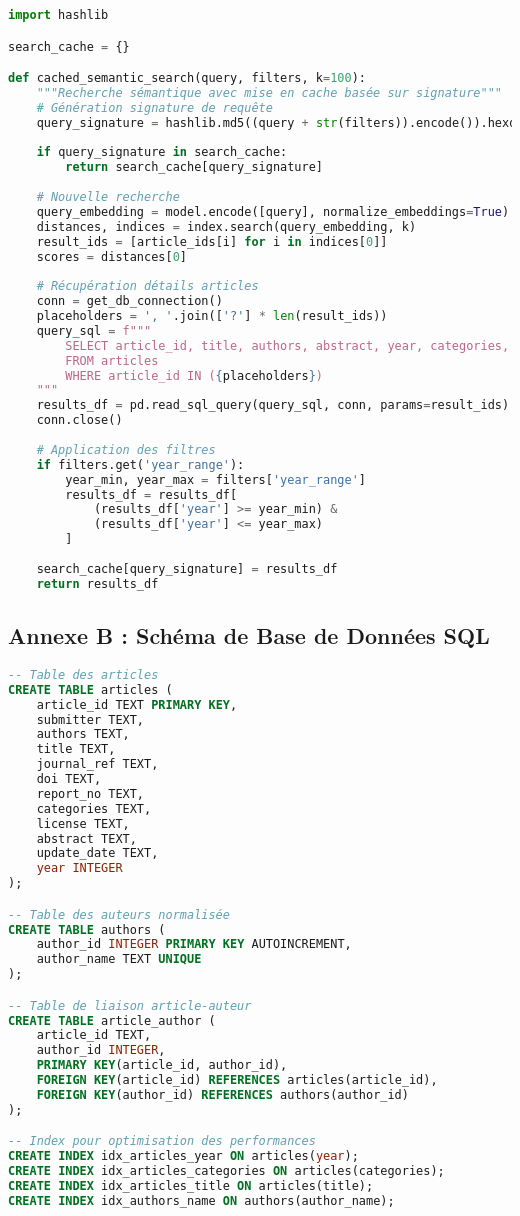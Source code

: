 \documentclass[12pt,a4paper]{article}
\begin{document}
\begin{lstlisting}[language=Python, caption=Implémentation de la recherche sémantique cachée]
import hashlib

search_cache = {}

def cached_semantic_search(query, filters, k=100):
    """Recherche sémantique avec mise en cache basée sur signature"""
    # Génération signature de requête
    query_signature = hashlib.md5((query + str(filters)).encode()).hexdigest()
    
    if query_signature in search_cache:
        return search_cache[query_signature]
    
    # Nouvelle recherche
    query_embedding = model.encode([query], normalize_embeddings=True)
    distances, indices = index.search(query_embedding, k)
    result_ids = [article_ids[i] for i in indices[0]]
    scores = distances[0]
    
    # Récupération détails articles
    conn = get_db_connection()
    placeholders = ', '.join(['?'] * len(result_ids))
    query_sql = f"""
        SELECT article_id, title, authors, abstract, year, categories, doi
        FROM articles
        WHERE article_id IN ({placeholders})
    """
    results_df = pd.read_sql_query(query_sql, conn, params=result_ids)
    conn.close()
    
    # Application des filtres
    if filters.get('year_range'):
        year_min, year_max = filters['year_range']
        results_df = results_df[
            (results_df['year'] >= year_min) & 
            (results_df['year'] <= year_max)
        ]
    
    search_cache[query_signature] = results_df
    return results_df
\end{lstlisting}

\subsection{Annexe B : Schéma de Base de Données SQL}

\begin{lstlisting}[language=SQL, caption=Création du schéma de base de données]
-- Table des articles
CREATE TABLE articles (
    article_id TEXT PRIMARY KEY,
    submitter TEXT,
    authors TEXT,
    title TEXT,
    journal_ref TEXT,
    doi TEXT,
    report_no TEXT,
    categories TEXT,
    license TEXT,
    abstract TEXT,
    update_date TEXT,
    year INTEGER
);

-- Table des auteurs normalisée
CREATE TABLE authors (
    author_id INTEGER PRIMARY KEY AUTOINCREMENT,
    author_name TEXT UNIQUE
);

-- Table de liaison article-auteur
CREATE TABLE article_author (
    article_id TEXT,
    author_id INTEGER,
    PRIMARY KEY(article_id, author_id),
    FOREIGN KEY(article_id) REFERENCES articles(article_id),
    FOREIGN KEY(author_id) REFERENCES authors(author_id)
);

-- Index pour optimisation des performances
CREATE INDEX idx_articles_year ON articles(year);
CREATE INDEX idx_articles_categories ON articles(categories);
CREATE INDEX idx_articles_title ON articles(title);
CREATE INDEX idx_authors_name ON authors(author_name);
\end{lstlisting}
\end{document}
